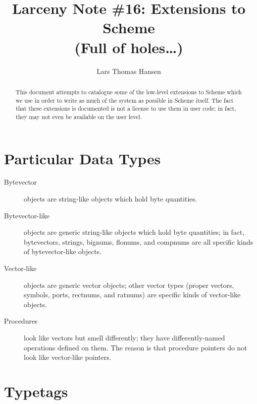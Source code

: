 %


\title{Larceny Note \#16: Extensions to Scheme \\
	{\tenrm (Full of holes\ldots)}}
\author{Lars Thomas Hansen}


\maketitle

\begin{abstract}
This document attempts to catalogue some of the low-level extensions to Scheme
which we use in order to write as much of the system as possible in Scheme
itself. The fact that these extensions is documented is not a license to use
them in user code; in fact, they may not even be available on the user level.
\end{abstract}

\section{Particular Data Types}

\begin{description}

\item[Bytevector] objects are string-like objects which hold byte quantities.

\item[Bytevector-like] objects are generic string-like objects which hold
byte quantities; in fact, bytevectors, strings, bignums, flonums, and
compnums are all specific kinds of bytevector-like objects.

\item[Vector-like] objects are generic vector objects; other vector types
(proper vectors, symbols, ports, rectnums, and ratnums) are specific kinds of
vector-like objects.

\item[Procedures] look like vectors but smell differently; they have
differently-named operations defined on them. The reason is that procedure
pointers do not look like vector-like pointers.

\end{description}


\section{Typetags}

